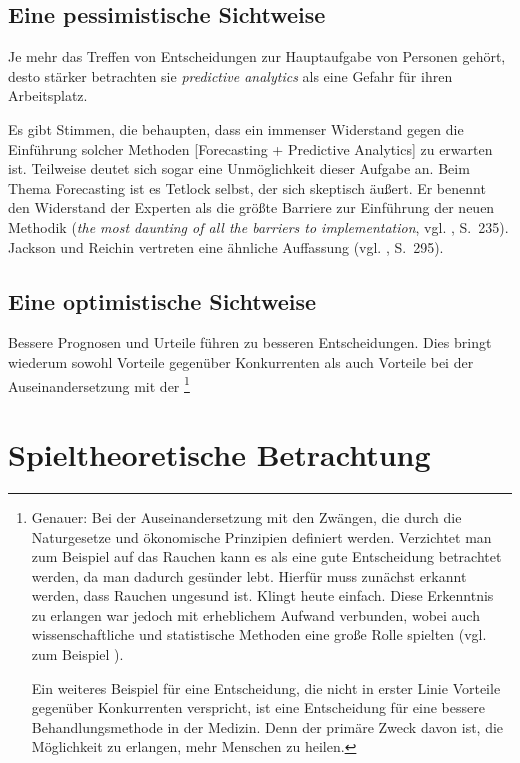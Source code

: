 \documentclass[12pt,a4paper,listof=totoc,oneside]{scrreprt}
\begin{document}
\subsection{Eine pessimistische Sichtweise}

Je mehr das Treffen von Entscheidungen zur Hauptaufgabe von Personen gehört,
desto stärker betrachten sie \emph{predictive analytics} als eine Gefahr für
ihren Arbeitsplatz.

Es gibt Stimmen, die behaupten, dass ein immenser Widerstand gegen die
Einführung solcher Methoden [Forecasting + Predictive Analytics] zu erwarten
ist. Teilweise deutet sich sogar eine Unmöglichkeit dieser Aufgabe an. Beim 
Thema Forecasting ist es Tetlock selbst, der sich skeptisch äußert. Er
benennt den Widerstand der Experten als die größte Barriere zur Einführung der
neuen Methodik (\emph{the most daunting of all the barriers to implementation},
vgl. \cite{Tetlock}, S.~235). Jackson und Reichin vertreten eine ähnliche
Auffassung (vgl. \cite{Jackson}, S.~295).

\subsection{Eine optimistische Sichtweise}

Bessere Prognosen und Urteile führen zu besseren Entscheidungen. Dies bringt
wiederum sowohl Vorteile gegenüber Konkurrenten als auch Vorteile bei der
Auseinandersetzung mit der \grqq\footnote{
Genauer: Bei der Auseinandersetzung mit den Zwängen, die durch die Naturgesetze
und ökonomische Prinzipien definiert werden. Verzichtet man zum Beispiel auf das 
Rauchen kann es als eine gute Entscheidung betrachtet werden, da man dadurch
gesünder lebt. Hierfür muss zunächst erkannt werden, dass Rauchen ungesund ist.
Klingt heute einfach. Diese Erkenntnis zu erlangen war jedoch mit erheblichem
Aufwand verbunden, wobei auch wissenschaftliche und statistische Methoden
eine große Rolle spielten (vgl. zum Beispiel \cite{Proctor}).

Ein weiteres Beispiel für eine Entscheidung, die nicht in erster Linie Vorteile
gegenüber Konkurrenten verspricht, ist eine Entscheidung für eine bessere
Behandlungsmethode in der Medizin. Denn der primäre Zweck davon ist, die 
Möglichkeit zu erlangen, mehr Menschen zu heilen.
}

\section{Spieltheoretische Betrachtung}
\end{document}
